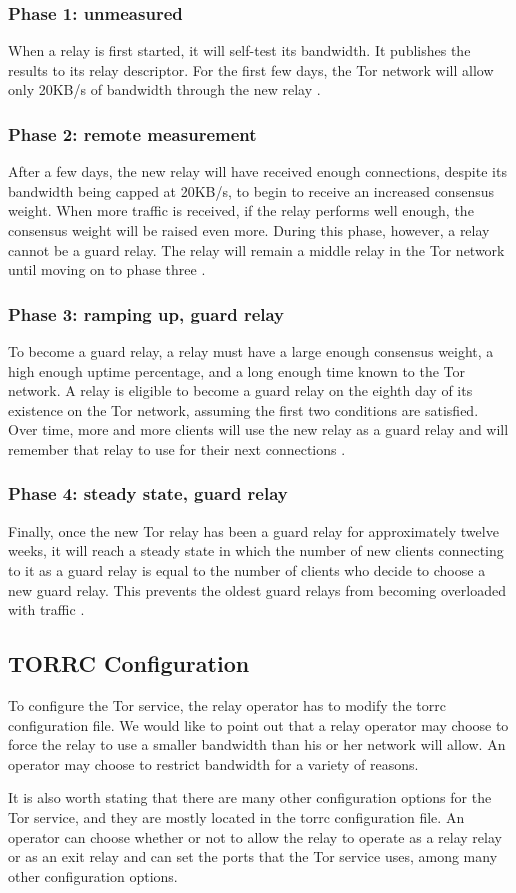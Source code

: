 \documentclass[12pt,journal]{IEEEtran}
\begin{document}
\subsubsection{Phase 1: unmeasured}
When a relay is first started, it will self-test its bandwidth. It publishes the results to its relay descriptor. For the first few days, the Tor network will allow only 20KB/s of bandwidth through the new relay \cite{arma2013}.
\subsubsection{Phase 2: remote measurement}
After a few days, the new relay will have received enough connections, despite its bandwidth being capped at 20KB/s, to begin to receive an increased consensus weight. When more traffic is received, if the relay performs well enough, the consensus weight will be raised even more. During this phase, however, a relay cannot be a guard relay. The relay will remain a middle relay in the Tor network until moving on to phase three \cite{arma2013}.
\subsubsection{Phase 3: ramping up, guard relay}
To become a guard relay, a relay must have a large enough consensus weight, a high enough uptime percentage, and a long enough time known to the Tor network. A relay is eligible to become a guard relay on the eighth day of its existence on the Tor network, assuming the first two conditions are satisfied. Over time, more and more clients will use the new relay as a guard relay and will remember that relay to use for their next connections \cite{arma2013}.
\subsubsection{Phase 4: steady state, guard relay}
Finally, once the new Tor relay has been a guard relay for approximately twelve weeks, it will reach a steady state in which the number of new clients connecting to it as a guard relay is equal to the number of clients who decide to choose a new guard relay. This prevents the oldest guard relays from becoming overloaded with traffic \cite{arma2013}.
\subsection{TORRC Configuration}
To configure the Tor service, the relay operator has to modify the torrc configuration file. We would like to point out that a relay operator may choose to force the relay to use a smaller bandwidth than his or her network will allow. An operator may choose to restrict bandwidth for a variety of reasons.
\par
It is also worth stating that there are many other configuration options for the Tor service, and they are mostly located in the torrc configuration file. An operator can choose whether or not to allow the relay to operate as a relay relay or as an exit relay and can set the ports that the Tor service uses, among many other configuration options.
\end{document}
